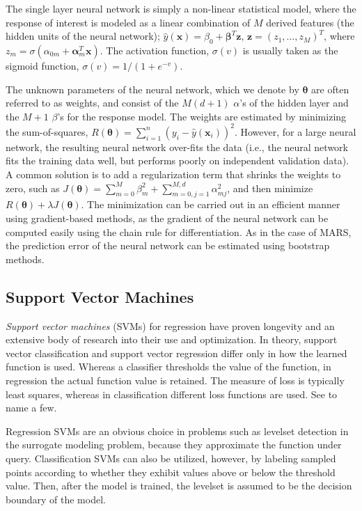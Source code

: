 The single layer neural network is simply a non-linear statistical model, where the response of interest is modeled as a linear combination of $M$ derived features (the hidden units of the neural network);
%
$\hat{y}(\mathbf{x}) = \beta_0 + \mathbf{\beta}^T \mathbf{z}$, $\mathbf{z} = (z_1, \dots, z_M)^T$, where $z_m = \sigma(\alpha_{0m} + \mathbf{\alpha}_m^T \mathbf{x})$.
%
The activation function, $\sigma(v)$ is usually taken as the sigmoid function, $\sigma(v) = 1/(1+e^{-v})$.

The unknown parameters of the neural network, which we denote by $\mathbf{\theta}$ are often referred to as weights, and consist of the $M(d+1)$ $\alpha$'s of the hidden layer and the $M+1$ $\beta$'s for the response model.
%
The weights are estimated by minimizing the sum-of-squares, $R(\mathbf{\theta}) = \sum_{i=1}^n (y_i - \hat{y}(\mathbf{x}_i))^2$.
%
However, for a large neural network, the resulting neural network over-fits the data (i.e., the neural network fits the training data well, but performs poorly on independent validation data).
%
A common solution is to add a regularization term that shrinks the weights to zero, such as $J(\mathbf{\theta}) = \sum_{m=0}^M \beta_{m}^2 + \sum_{m=0,j=1}^{M,d} \alpha_{mj}^2$, and then minimize $R(\mathbf{\theta}) + \lambda J(\mathbf{\theta})$.
%
The minimization can be carried out in an efficient manner using gradient-based methods, as the gradient of the neural network can be computed easily using the chain rule for differentiation.
%
As in the case of MARS, the prediction error of the neural network can be estimated using bootstrap methods.

\subsection{Support Vector Machines}
\emph{Support vector machines} (SVMs) for regression have proven longevity and an extensive body of research into their use and optimization.
%
In theory, support vector classification and support vector regression differ only in how the learned function is used.
%
Whereas a classifier thresholds the value of the function, in regression the actual function value is retained.
%
The measure of loss is typically least squares, whereas in classification different loss functions are used.
%
See \cite{SmolaScholkopf2004,SuykensVandewalle1999,SuykensDeBrabanterLukas2002,DruckerBurgesKaufman1997} to name a few.

Regression SVMs are an obvious choice in problems such as levelset detection in the surrogate modeling problem, because they approximate the function under query.
%
Classification SVMs can also be utilized, however, by labeling sampled points according to whether they exhibit values above or below the threshold value.
%
Then, after the model is trained, the levelset is assumed to be the decision boundary of the model.

